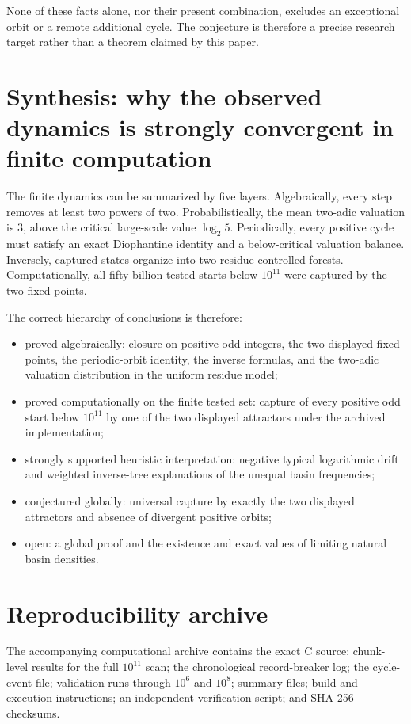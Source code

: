 \documentclass[11pt]{article}
\begin{document}
None of these facts alone, nor their present combination, excludes an exceptional orbit or a remote additional cycle. The conjecture is therefore a precise research target rather than a theorem claimed by this paper.

\section{Synthesis: why the observed dynamics is strongly convergent in finite computation}

The finite dynamics can be summarized by five layers. Algebraically, every step removes at least two powers of two. Probabilistically, the mean two-adic valuation is $3$, above the critical large-scale value $\log_2 5$. Periodically, every positive cycle must satisfy an exact Diophantine identity and a below-critical valuation balance. Inversely, captured states organize into two residue-controlled forests. Computationally, all fifty billion tested starts below $10^{11}$ were captured by the two fixed points.

The correct hierarchy of conclusions is therefore:
\begin{itemize}
\item proved algebraically: closure on positive odd integers, the two displayed fixed points, the periodic-orbit identity, the inverse formulas, and the two-adic valuation distribution in the uniform residue model;
\item proved computationally on the finite tested set: capture of every positive odd start below $10^{11}$ by one of the two displayed attractors under the archived implementation;
\item strongly supported heuristic interpretation: negative typical logarithmic drift and weighted inverse-tree explanations of the unequal basin frequencies;
\item conjectured globally: universal capture by exactly the two displayed attractors and absence of divergent positive orbits;
\item open: a global proof and the existence and exact values of limiting natural basin densities.
\end{itemize}

\section{Reproducibility archive}

The accompanying computational archive contains the exact C source; chunk-level results for the full $10^{11}$ scan; the chronological record-breaker log; the cycle-event file; validation runs through $10^6$ and $10^8$; summary files; build and execution instructions; an independent verification script; and SHA-256 checksums.
\end{document}
